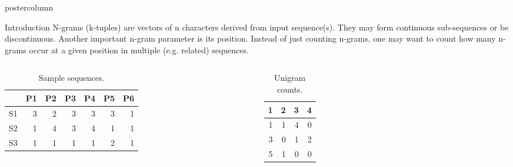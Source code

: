 \documentclass[final]{beamer}\usepackage[]{graphicx}\usepackage[]{color}
\newlength{\columnheight}
\begin{document}
\begin{frame}
  \begin{columns}
    \begin{column}{.49\textwidth}
      \begin{beamercolorbox}[center,wd=\textwidth]{postercolumn}
        \begin{minipage}[T]{.95\textwidth}
          \parbox[t][\columnheight]{\textwidth}
            {
    
        
    \begin{block}{Introduction}
      N-grams (k-tuples) are vectors of n characters derived from input sequence(s). They may form continuous sub-sequences or be discontinuous. Another important n-gram parameter is its position. Instead of just counting n-grams, one may want to count how many n-grams occur at a given position in multiple (e.g. related) sequences.

\small{
       \begin{columns}[c] %
\begin{table}[ht]
\centering
\begin{tabular}{rrrrrrr}
  \hline
 & P1 & P2 & P3 & P4 & P5 & P6 \\ 
  \hline
S1 & 3 & 2 & 3 & 3 & 3 & 1 \\ 
  S2 & 1 & 4 & 3 & 4 & 1 & 1 \\ 
  S3 & 1 & 1 & 1 & 1 & 2 & 1 \\ 
   \hline
\end{tabular}
\caption{Sample sequences.} 
\end{table}

      
      

    
\begin{table}[ht]
\centering
\begin{tabular}{rrrr}
  \hline
1 & 2 & 3 & 4 \\ 
  \hline
1 & 1 & 4 & 0 \\ 
  3 & 0 & 1 & 2 \\ 
  5 & 1 & 0 & 0 \\ 
   \hline
\end{tabular}
\caption{Unigram counts.} 
\end{table}



\end{columns}}
\end{block}}
\end{minipage}
\end{beamercolorbox}
\end{column}
\end{columns}
\end{frame}
\end{document}
